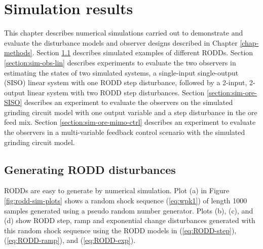 \chapter{Simulation results}  \label{chap-simulation}

This chapter describes numerical simulations carried out to demonstrate and evaluate the disturbance models and observer designs described in Chapter \ref{chap-methods}. Section \ref{section:sim-RODDs} describes simulated examples of different RODDs. Section \ref{section:sim-obs-lin} describes experiments to evaluate the two observers in estimating the states of two simulated systems, a single-input single-output (SISO) linear system with one RODD step disturbance, followed by a 2-input, 2-output linear system with two RODD step disturbances. Section \ref{section:sim-ore-SISO} describes an experiment to evaluate the observers on the simulated grinding circuit model with one output variable and a step disturbance in the ore feed mix. Section \ref{section:sim-ore-mimo-ctrl} describes an experiment to evaluate the observers in a multi-variable feedback control scenario with the simulated grinding circuit model.


\section{Generating RODD disturbances} \label{section:sim-RODDs}

RODDs are easy to generate by numerical simulation.  Plot (a) in Figure \ref{fig:rodd-sim-plots} shows a random shock sequence (\ref{eq:wpk1}) of length 1000 samples generated using a pseudo random number generator. Plots (b), (c), and (d) show RODD step, ramp and exponential change disturbances generated with this random shock sequence using the RODD models in (\ref{eq:RODD-step}), (\ref{eq:RODD-ramp}), and (\ref{eq:RODD-exp}). 


